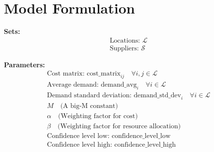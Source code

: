 \documentclass[preprint,review, 11pt,3p,authoryear]{elsarticle}
\begin{document}










\section*{Model Formulation}

\textbf{Sets:}
\begin{align*}
& \text{Locations: } \mathcal{L} \\
& \text{Suppliers: } \mathcal{S}
\end{align*}

\textbf{Parameters:}
\begin{align*}
& \text{Cost matrix: } \text{cost\_matrix}_{ij} \quad \forall i, j \in \mathcal{L} \\
& \text{Average demand: } \text{demand\_avg}_i \quad \forall i \in \mathcal{L} \\
& \text{Demand standard deviation: } \text{demand\_std\_dev}_i \quad \forall i \in \mathcal{L} \\
& M \quad \text{(A big-M constant)} \\
& \alpha \quad \text{(Weighting factor for cost)} \\
& \beta \quad \text{(Weighting factor for resource allocation)} \\
& \text{Confidence level low: } \text{confidence\_level\_low} \\
& \text{Confidence level high: } \text{confidence\_level\_high}
\end{align*}
\end{document}
